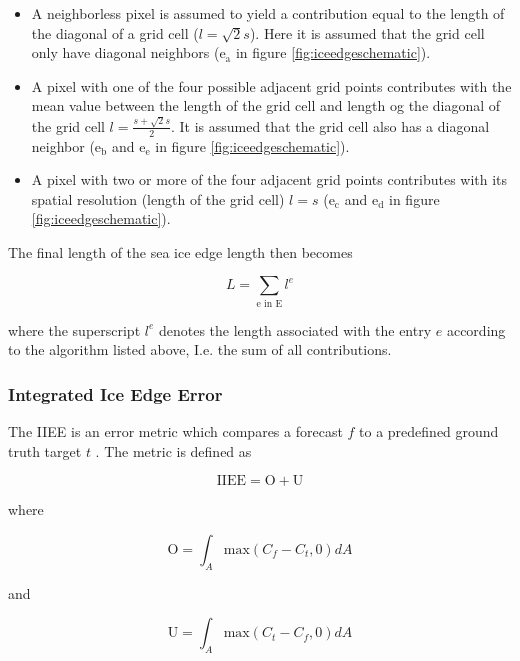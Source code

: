 \documentclass[../main/thesis.tex]{subfiles}
\begin{document}
\begin{itemize}
    \item A neighborless pixel is assumed to yield a contribution equal to the length of the diagonal of a grid cell ($l = \sqrt2s$). Here it is assumed that the grid cell only have diagonal neighbors ($\text{e}_\text{a}$ in figure \ref{fig:iceedgeschematic}).
    \item A pixel with one of the four possible adjacent grid points contributes with the mean value between the length of the grid cell and length og the diagonal of the grid cell $l = \frac{s + \sqrt2s}{2}$. It is assumed that the grid cell also has a diagonal neighbor ($\text{e}_\text{b}$ and $\text{e}_\text{e}$ in figure \ref{fig:iceedgeschematic}).
    \item A pixel with two or more of the four adjacent grid points contributes with its spatial resolution (length of the grid cell) $l = s$ ($\text{e}_\text{c}$ and $\text{e}_\text{d}$ in figure \ref{fig:iceedgeschematic}).
\end{itemize}

The final length of the sea ice edge length then becomes

\begin{equation}
    \label{eq:ice-edge-length}
    L = \sum_\text{e in E} l^e
\end{equation}

where the superscript $l^e$ denotes the length associated with the entry $e$ according to the algorithm listed above, I.e. the sum of all contributions.

\subsubsection{Integrated Ice Edge Error}
\label{sec:iiee}
The IIEE is an error metric which compares a forecast $f$ to a predefined ground truth target $t$ \citet{Goessling2016}. The metric is defined as

\begin{equation}
    \label{eq:IIEE}
    \text{IIEE} = \text{O} + \text{U}
\end{equation}

where 

\begin{equation}
    \label{eq:a_plus}
    \text{O} = \int_A\text{max}(C_f - C_t, 0)dA
\end{equation}

and

\begin{equation}
    \label{eq:a_minus}
    \text{U} = \int_A\text{max}(C_t - C_f, 0)dA
\end{equation}
\end{document}
